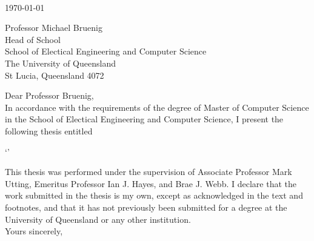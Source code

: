 \begin{flushright}
    \authortext\\
    \href{mailto:\authoremailtext}{\authoremailtext}
\end{flushright}

\vspace{2cm}
\noindent
\today \\\bigskip

\noindent
Professor Michael Bruenig\\
Head of School\\
School of Electical Engineering and Computer Science\\
The University of Queensland\\
St Lucia, Queensland 4072\\\bigskip

\noindent
Dear Professor Bruenig,\\

In accordance with the requirements of the degree of Master of Computer Science in the School of Electical Engineering and Computer Science, I present the following thesis entitled

\begin{center}
`\titletext'
\end{center}

This thesis was performed under the supervision of Associate Professor Mark Utting, Emeritus Professor Ian J. Hayes, and Brae J. Webb. I declare that the work submitted in the thesis is my own, except as acknowledged in the text and footnotes, and that it has not previously been submitted for a degree at the University of Queensland or any other institution.\\

\noindent
Yours sincerely,\\\\%

\noindent
\authortext

\clearpage